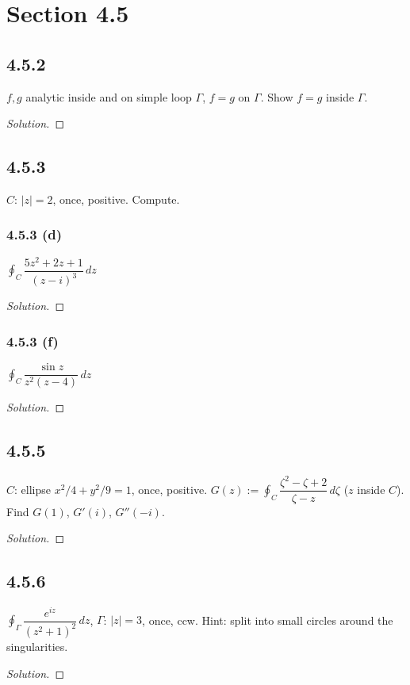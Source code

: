 \documentclass{article}
\newenvironment{solution}{
\begin{proof}[Solution]}{
\end{proof}}
\begin{document}
\section*{Section 4.5}

\subsection*{4.5.2}
$f, g$ analytic inside and on simple loop $\Gamma$, $f=g$ on $\Gamma$.
Show $f=g$ inside $\Gamma$.
\begin{solution}
\end{solution}

\subsection*{4.5.3}
$C$: $|z|=2$, once, positive. Compute.

\subsubsection*{4.5.3 (d)}
$\oint_C \dfrac{5z^2+2z+1}{(z-i)^3}\,dz$
\begin{solution}
\end{solution}

\subsubsection*{4.5.3 (f)}
$\oint_C \dfrac{\sin z}{z^2(z-4)}\,dz$
\begin{solution}
\end{solution}

\subsection*{4.5.5}
$C$: ellipse $x^2/4+y^2/9=1$, once, positive.
$G(z) := \oint_C \dfrac{\zeta^2-\zeta+2}{\zeta-z}\,d\zeta$ ($z$ inside $C$).
Find $G(1)$, $G'(i)$, $G''(-i)$.
\begin{solution}
\end{solution}

\subsection*{4.5.6}
$\oint_\Gamma \dfrac{e^{iz}}{(z^2+1)^2}\,dz$, $\Gamma$: $|z|=3$, once, ccw.
Hint: split into small circles around the singularities.
\begin{solution}
\end{solution}
\end{document}
